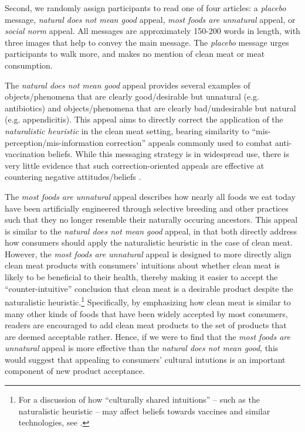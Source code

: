 \documentclass[12pt]{article}
\newcommand{\todo}[1]{\textit{\textcolor{red}{$<$todo$>$ #1 $<$/todo$>$}}}
\begin{document}

Second, we randomly assign participants to read one of four articles: a \textit{placebo} message, \textit{natural does not mean good} appeal, \textit{most foods are unnatural} appeal, or \textit{social norm} appeal. All messages are approximately 150-200 words in length, with three images that help to convey the main message. The \textit{placebo} message urges participants to walk more, and makes no mention of clean meat or meat consumption.


The \textit{natural does not mean good} appeal provides several examples of objects/phenomena that are clearly good/desirable but unnatural (e.g. antibiotics) and objects/phenomena that are clearly bad/undesirable but natural (e.g. appendicitis). This appeal aims to directly correct the application of the \textit{naturalistic heuristic} in the clean meat setting, bearing similarity to ``mis-perception/mis-information correction'' appeals commonly used to combat anti-vaccination beliefs. While this messaging strategy is in widespread use, there is very little evidence that such correction-oriented appeals are effective at countering negative attitudes/beliefs \citep{Nyhan2015,Nyhan2014}.



The \textit{most foods are unnatural} appeal describes how nearly all foods we eat today have been artificially engineered through selective breeding and other practices such that they no longer resemble their naturally occuring ancestors. This appeal is similar to the \textit{natural does not mean good} appeal, in that both directly address how consumers should apply the naturalistic heuristic in the case of clean meat. However, the \textit{most foods are unnatural} appeal is designed to more directly align clean meat products with consumers' intuitions about whether clean meat is likely to be beneficial to their health, thereby making it easier to accept the ``counter-intuitive'' conclusion that clean meat is a desirable product despite the naturalistic heuristic.\footnote{For a discussion of how ``culturally shared intuitions'' -- such as the naturalistic heuristic -- may affect beliefs towards vaccines and similar technologies, see \citet{Miton2015}.} Specifically, by emphasizing how clean meat is similar to many other kinds of foods that have been widely accepted by most consumers, readers are encouraged to add clean meat products to the set of products that are deemed acceptable rather. Hence, if we were to find that the \textit{most foods are unnatural} appeal is more effective than the \textit{natural does not mean good}, this would suggest that appealing to consumers' cultural intutions is an important component of new product acceptance.
\end{document}
